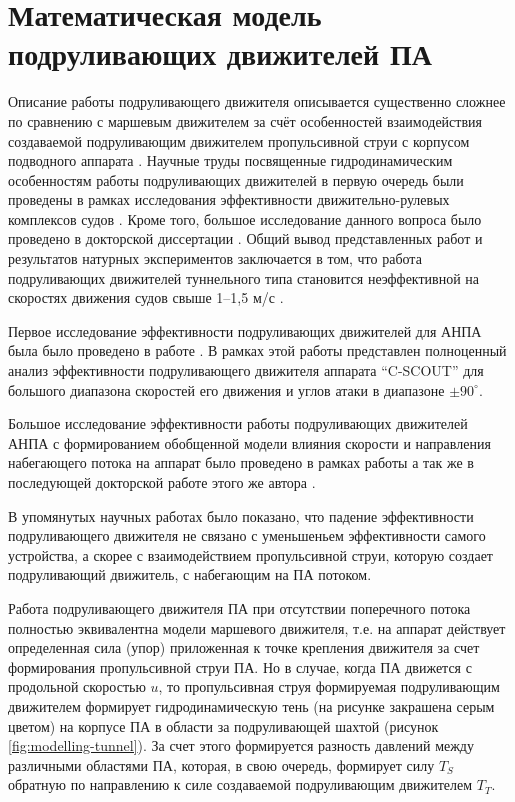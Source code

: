 \section{Математическая модель подруливающих движителей ПА}
Описание работы подруливающего движителя описывается существенно сложнее по сравнению с маршевым движителем за счёт особенностей взаимодействия создаваемой подруливающим движителем пропульсивной струи с корпусом подводного аппарата \cite{tolstonogov2017auv}.
Научные труды посвященные гидродинамическим особенностям работы подруливающих движителей в первую очередь были проведены в рамках исследования эффективности движительно-рулевых комплексов судов \cite{chislett1966influence, english1964design, brix1973lateral}.
Кроме того, большое исследование данного вопроса было проведено в докторской диссертации \cite{nienhuis1992analysis}.
Общий вывод представленных работ и результатов натурных экспериментов заключается в том, что работа подруливающих движителей туннельного типа становится неэффективной на скоростях движения судов свыше 1–1,5 м/с \cite{english63}.

Первое исследование эффективности подруливающих движителей для АНПА была было проведено в работе \cite{saunders2002effect}. 
В рамках этой работы представлен полноценный анализ эффективности подруливающего движителя аппарата ``C-SCOUT'' для большого диапазона скоростей его движения и углов атаки в диапазоне $\pm90^{\circ}$.

Большое исследование эффективности работы подруливающих движителей АНПА с формированием обобщенной модели влияния скорости и направления набегающего потока на аппарат было проведено в рамках работы \cite{palmer2008modelling} а так же в последующей докторской работе этого же автора \cite{palmer2009analysis}.

В упомянутых научных работах было показано, что падение эффективности подруливающего движителя не связано с уменьшеньем эффективности самого устройства, а скорее с взаимодействием пропульсивной струи, которую создает подруливающий движитель, с набегающим на ПА потоком.

Работа подруливающего движителя ПА при отсутствии поперечного потока полностью эквивалентна модели маршевого движителя, т.е. на аппарат действует определенная сила (упор) приложенная к точке крепления движителя за счет формирования пропульсивной струи ПА.
Но в случае, когда ПА движется с продольной скоростью $u$, то пропульсивная струя формируемая подруливающим движителем формирует гидродинамическую тень (на рисунке закрашена серым цветом) на корпусе ПА в области за подруливающей шахтой (рисунок \ref{fig:modelling-tunnel}).
За счет этого формируется разность давлений между различными областями ПА, которая, в свою очередь, формирует силу $T_S$ обратную по направлению к силе создаваемой подруливающим движителем $T_T$.

